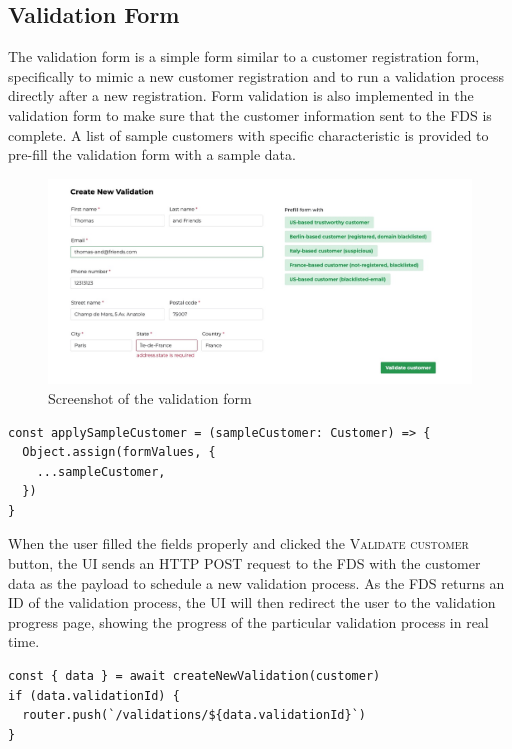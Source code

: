  \subsection{Validation Form}

    The validation form is a simple form similar to a customer registration form, specifically to mimic a new customer registration and to run a validation process directly after a new registration. Form validation is also implemented in the validation form to make sure that the customer information sent to the FDS is complete. A list of sample customers with specific characteristic is provided to pre-fill the validation form with a sample data. 

    \begin{figure}[!ht]
      \includegraphics[width=\textwidth]{images/ss_customer_form.jpeg}
      \caption{Screenshot of the validation form}
    \end{figure}

    \newpage
    \begin{lstlisting}[style=es6, caption={Prefilling form values with a sample customer data (TypeScript)}]
const applySampleCustomer = (sampleCustomer: Customer) => {
  Object.assign(formValues, {
    ...sampleCustomer,
  })
}
\end{lstlisting}

    When the user filled the fields properly and clicked the \textsc{Validate customer} button, the UI sends an HTTP POST request to the FDS with the customer data as the payload to schedule a new validation process. As the FDS returns an ID of the validation process, the UI will then redirect the user to the validation progress page, showing the progress of the particular validation process in real time. 

    \begin{lstlisting}[style=es6, caption={Redirecting to the progress page when a validation process is scheduled successfully (TypeScript)}]
const { data } = await createNewValidation(customer)
if (data.validationId) {
  router.push(`/validations/${data.validationId}`)
}
\end{lstlisting}

